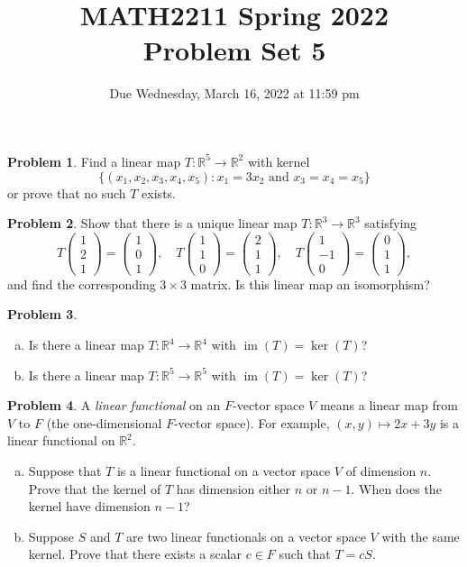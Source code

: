 \documentclass[11pt,oneside]{amsart}
\title{MATH2211 Spring 2022\\
Problem Set 5}
\author{Due Wednesday, March 16, 2022 at 11:59 pm}
\theoremstyle{definition}
\newtheorem{problem}{Problem}
\newcommand{\bR}{\mathbb{R}}
\newcommand*\dcolvec[1]{\begin{pmatrix}#1\end{pmatrix}}
\DeclareMathOperator{\im}{im}
\begin{document}
    \maketitle
    
    \begin{problem}
        Find a linear map $T\colon\bR^5\to\bR^2$ with kernel
        \[\{(x_1, x_2, x_3, x_4, x_5): x_1=3x_2\text{ and }x_3=x_4=x_5\}\]
        or prove that no such $T$ exists.
    \end{problem}
    
    \begin{problem}
        Show that there is a unique linear map $T\colon\bR^3\to\bR^3$ satisfying
        \[T\dcolvec{1\\2\\1}=\dcolvec{1\\0\\1},\quad T\dcolvec{1\\1\\0}=\dcolvec{2\\1\\1},\quad T\dcolvec{1\\-1\\0}=\dcolvec{0\\1\\1},\]
        and find the corresponding $3\times 3$ matrix. Is this linear map an isomorphism?
    \end{problem}
    
    \begin{problem}
        \leavevmode\begin{enumerate}[(a)]
            \item Is there a linear map $T\colon\bR^4\to\bR^4$ with $\im(T)=\ker(T)$?
            \item Is there a linear map $T\colon\bR^5\to\bR^5$ with $\im(T)=\ker(T)$?
        \end{enumerate}
    \end{problem}
    
    \begin{problem}
        A \emph{linear functional} on an $F$-vector space $V$ means a linear map from $V$ to $F$ (the one-dimensional $F$-vector space). For example, $(x,y)\mapsto 2x+3y$ is a linear functional on $\bR^2$.
        
        \begin{enumerate}[(a)]
            \item Suppose that $T$ is a linear functional on a vector space $V$ of dimension $n$. Prove that the kernel of $T$ has dimension either $n$ or $n-1$. When does the kernel have dimension $n-1$?
            \item Suppose $S$ and $T$ are two linear functionals on a vector space $V$ with the same kernel. Prove that there exists a scalar $c\in F$ such that $T=cS$.
        \end{enumerate}
    \end{problem}
    
\end{document}
